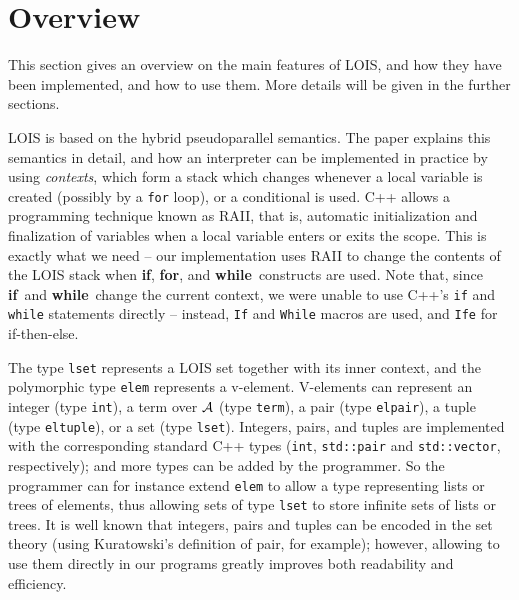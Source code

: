 \section{Overview}\label{sec:overview}
This section gives an overview on the main features of LOIS, and
how they have been implemented, and how to use them. More details
will be given in the further sections.

\def\lzWhile{{\mbox{\bf while}}\xspace}
\def\lzFor{{\mbox{\bf for}}\xspace}
\def\lzSet{{\mbox{\bf set}}\xspace}
\def\lzInt{{\mbox{\bf int}}\xspace}
\def\lzIn{{\mbox{\bf in}}\xspace}
\def\lzBool{{\mbox{\bf bool}}\xspace}
\def\lzIf{{\mbox{\bf if}}\xspace}

LOIS is based on the hybrid pseudoparallel semantics. The paper
\cite{lois-sem} explains this semantics in detail, and how an
interpreter can be implemented in practice by using \emph{contexts},
which form a stack which changes whenever a local variable is created (possibly by a
\verb-for- loop), or a conditional is used. 
C++ allows a programming technique known as RAII, that is,
automatic initialization and finalization of variables when
a local variable enters or exits the scope. This is exactly
what we need -- our implementation
uses RAII to change the contents of the LOIS stack when \lzIf,
\lzFor, and \lzWhile\ constructs are used.
Note that, since \lzIf\ and \lzWhile\ change the current context,
we were unable to use C++'s \verb-if- and \verb-while- statements directly
-- instead, \verb-If- and \verb-While- macros are used, and
\verb-Ife- for if-then-else.

The type \verb|lset| represents a LOIS set together with its
inner context, and the polymorphic type \verb|elem| represents
a v-element. V-elements can represent 
an integer (type \verb-int-), a term over ${\mathcal A}$
(type \verb-term-), a pair (type \verb-elpair-), a tuple (type \verb-eltuple-), or a set (type \verb-lset-). Integers, pairs, and tuples are implemented with the corresponding standard C++ types
(\verb|int|, \verb|std::pair| and \verb|std::vector|, respectively); 
and more types can be added by the programmer.
So the programmer can for instance extend 
\verb|elem| to allow a type 
representing lists or trees of elements,
thus allowing sets of type \verb|lset| to store infinite
sets of lists or trees.
It is well known that integers, pairs and tuples can be encoded in 
the set theory (using Kuratowski's definition of pair, for example);
however, allowing to use them directly in our programs greatly improves
both readability and efficiency.


